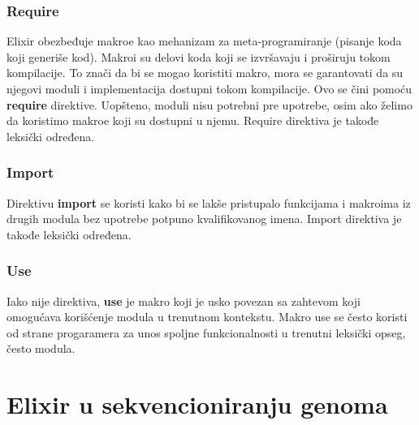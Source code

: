 \documentclass[12pt,oneside]{memoir}
\begin{document}
\subsection{Require}
Elixir obezbeđuje makroe kao mehanizam za meta-programiranje (pisanje koda koji generiše kod). Makroi su delovi koda koji se izvršavaju i proširuju tokom kompilacije. To znači da bi se mogao koristiti makro, mora se garantovati da su njegovi moduli i implementacija dostupni tokom kompilacije. Ovo se čini pomoću \textbf{require} direktive. Uopšteno, moduli nisu potrebni pre upotrebe, osim ako želimo da koristimo makroe koji su dostupni u njemu. Require direktiva je takođe leksički određena.

\subsection{Import}
Direktivu \textbf{import} se koristi kako bi se lakše pristupalo funkcijama i makroima iz drugih modula bez upotrebe potpuno kvalifikovanog imena. Import direktiva je takođe leksički određena. 

\subsection{Use}
Iako nije direktiva, \textbf{use} je makro koji je usko povezan sa zahtevom koji omogućava korišćenje modula u trenutnom kontekstu. Makro use se često koristi od strane progaramera za unos spoljne funkcionalnosti u trenutni leksički opseg, često modula.


\chapter{Elixir u sekvencioniranju genoma}

\begin{comment}
Elixir je dinamičan, funkcionalni programski jezik koji se pokreće na Erlang vituelnoj mašini, pa samim tim i deli pogodna svojstva kao što su
konkurentnost i tolerisanje grešaka, koje dolaze sa ovim okruženjem.\cite{DefinicijaElixira}
\end{comment}
\end{document}
